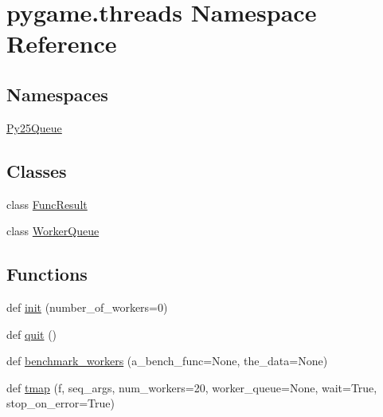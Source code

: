 \hypertarget{namespacepygame_1_1threads}{}\section{pygame.\+threads Namespace Reference}
\label{namespacepygame_1_1threads}
\subsection*{Namespaces}
\begin{DoxyCompactItemize}
\item 
 \hyperlink{namespacepygame_1_1threads_1_1_py25_queue}{Py25\+Queue}
\end{DoxyCompactItemize}
\subsection*{Classes}
\begin{DoxyCompactItemize}
\item 
class \hyperlink{classpygame_1_1threads_1_1_func_result}{Func\+Result}
\item 
class \hyperlink{classpygame_1_1threads_1_1_worker_queue}{Worker\+Queue}
\end{DoxyCompactItemize}
\subsection*{Functions}
\begin{DoxyCompactItemize}
\item 
def \hyperlink{namespacepygame_1_1threads_ae46d2018611d92c7aaed2a910a68d334}{init} (number\+\_\+of\+\_\+workers=0)
\item 
def \hyperlink{namespacepygame_1_1threads_a68b34d829709c92a3a928a6c523c26d3}{quit} ()
\item 
def \hyperlink{namespacepygame_1_1threads_af5a9cff0c554b4f8b31b1ee47e616213}{benchmark\+\_\+workers} (a\+\_\+bench\+\_\+func=None, the\+\_\+data=None)
\item 
def \hyperlink{namespacepygame_1_1threads_a970354d230ca56169d26606be8997346}{tmap} (f, seq\+\_\+args, num\+\_\+workers=20, worker\+\_\+queue=None, wait=True, stop\+\_\+on\+\_\+error=True)
\end{DoxyCompactItemize}
